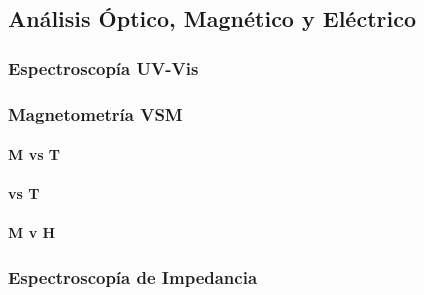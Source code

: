 \documentclass[../main.tex]{subfiles}
\begin{document}
\subsection{Análisis Óptico, Magnético y Eléctrico} \label{sec:analisisoptmagelec}
\subsubsection{Espectroscopía UV-Vis}

\subsubsection{Magnetometría VSM}

\paragraph{M vs T}

\paragraph{\textchi{} vs T}

\paragraph{M v H}
\subsubsection{Espectroscopía de Impedancia}
\end{document}
